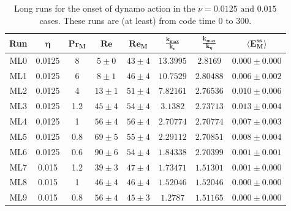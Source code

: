 \documentclass[12pt,a4paper]{report}
\begin{document}
\begin{table}[ht]
\begin{center}
\begin{tabular}{||c|c|c|c|c|c|c|c||}
\hline
\textbf{Run} & $ \bm{\eta} $ & $ \bm{ Pr_M} $ & $ \bm{ Re} $ & $ \bm{ Re_M} $ & $ \bm{ \frac{k_{max}}{k_\nu}} $ & $ \bm{ \frac{k_{max}}{k_\eta}} $ & $ \bm{ \langle E_M^{ss}} \rangle $ \\ \hline
ML0 & 0.0125 & 8 & $ 5 \pm 0 $ & $ 43 \pm 4 $ & $ 13.3995 $ & $ 2.8169 $ & $ 0.000 \pm 0.000 $ \\ \hline
ML1 & 0.0125 & 6 & $ 8 \pm 1 $ & $ 46 \pm 4 $ & $ 10.7529 $ & $ 2.80488 $ & $ 0.006 \pm 0.002 $ \\ \hline
ML2 & 0.0125 & 4 & $ 13 \pm 1 $ & $ 51 \pm 4 $ & $ 7.82161 $ & $ 2.76536 $ & $ 0.010 \pm 0.006 $ \\ \hline
ML3 & 0.0125 & 1.2 & $ 45 \pm 4 $ & $ 54 \pm 4 $ & $ 3.1382 $ & $ 2.73713 $ & $ 0.013 \pm 0.004 $ \\ \hline
ML4 & 0.0125 & 1 & $ 56 \pm 4 $ & $ 56 \pm 4 $ & $ 2.70774 $ & $ 2.70774 $ & $ 0.007 \pm 0.003 $ \\ \hline
ML5 & 0.0125 & 0.8 & $ 69 \pm 5 $ & $ 55 \pm 4 $ & $ 2.29112 $ & $ 2.70851 $ & $ 0.008 \pm 0.004 $ \\ \hline
ML6 & 0.0125 & 0.6 & $ 90 \pm 6 $ & $ 54 \pm 4 $ & $ 1.84338 $ & $ 2.70399 $ & $ 0.001 \pm 0.001 $ \\ \hline
ML7 & 0.015 & 1.2 & $ 39 \pm 3 $ & $ 47 \pm 4 $ & $ 1.73471 $ & $ 1.51301 $ & $ 0.001 \pm 0.000 $ \\ \hline
ML8 & 0.015 & 1 & $ 46 \pm 4 $ & $ 46 \pm 4 $ & $ 1.52046 $ & $ 1.52046 $ & $ 0.000 \pm 0.000 $ \\ \hline
ML9 & 0.015 & 0.8 & $ 56 \pm 4 $ & $ 45 \pm 3 $ & $ 1.2787 $ & $ 1.51165 $ & $ 0.000 \pm 0.000 $ \\ \hline
\end{tabular}
\end{center}
\caption{Long runs for the onset of dynamo action in the $\nu=0.0125\text{ and }0.015$ cases. These runs are (at least) from code time 0 to 300.}
\label{tableB3}
\end{table}
\end{document}
